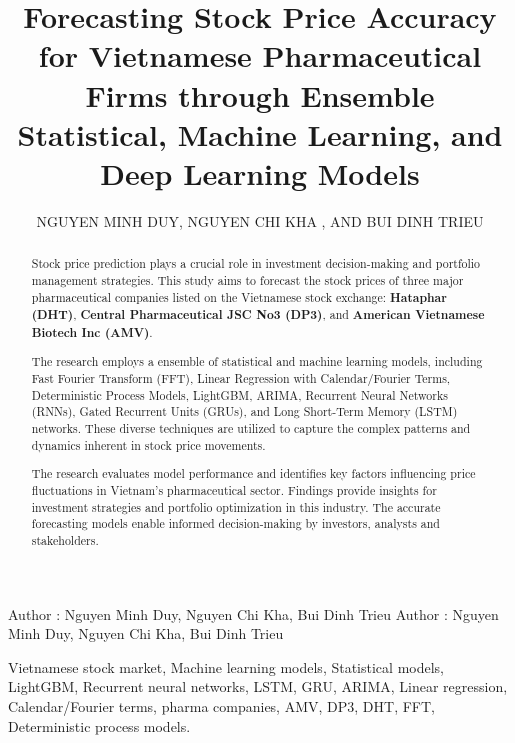 \documentclass{ieeeojies}
\begin{document}
\title{Forecasting Stock Price Accuracy for Vietnamese Pharmaceutical Firms through Ensemble Statistical, Machine Learning, and Deep Learning Models}

\author{\uppercase{Nguyen Minh Duy},
\uppercase{Nguyen Chi Kha , and Bui Dinh Trieu}}

\address[1]{Faculty of Information Systems, University of Information Technology, (e-mail: 21522005@gm.uit.edu.vn)}
\address[2]{Faculty of Information Systems, University of Information Technology, (e-mail: 21522179@gm.uit.edu.vn)}
\address[3]{Faculty of Information Systems, University of Information Technology, (e-mail: 21521576@gm.uit.edu.vn)}

\markboth
{Author \headeretal: Nguyen Minh Duy, Nguyen Chi Kha, Bui Dinh Trieu}
{Author \headeretal: Nguyen Minh Duy, Nguyen Chi Kha, Bui Dinh Trieu}

\begin{abstract}
Stock price prediction plays a crucial role in investment decision-making and portfolio management strategies. This study aims to forecast the stock prices of three major pharmaceutical companies listed on the Vietnamese stock exchange: \textbf{Hataphar (DHT)}, \textbf{Central Pharmaceutical JSC No3 (DP3)}, and \textbf{American Vietnamese Biotech Inc (AMV)}.

The research employs a ensemble of statistical and machine learning models, including Fast Fourier Transform (FFT), Linear Regression with Calendar/Fourier Terms, Deterministic Process Models, LightGBM, ARIMA, Recurrent Neural Networks (RNNs), Gated Recurrent Units (GRUs), and Long Short-Term Memory (LSTM) networks. These diverse techniques are utilized to capture the complex patterns and dynamics inherent in stock price movements. 

The research evaluates model performance and identifies key factors influencing price fluctuations in Vietnam's pharmaceutical sector. Findings provide insights for investment strategies and portfolio optimization in this industry. The accurate forecasting models enable informed decision-making by investors, analysts and stakeholders. 
\end{abstract}

\begin{keywords}
Vietnamese stock market, Machine learning models, Statistical models, LightGBM, Recurrent neural networks, LSTM, GRU, ARIMA, Linear regression, Calendar/Fourier terms, pharma companies, AMV, DP3, DHT, FFT, Deterministic process models.
\end{keywords}
\end{document}
